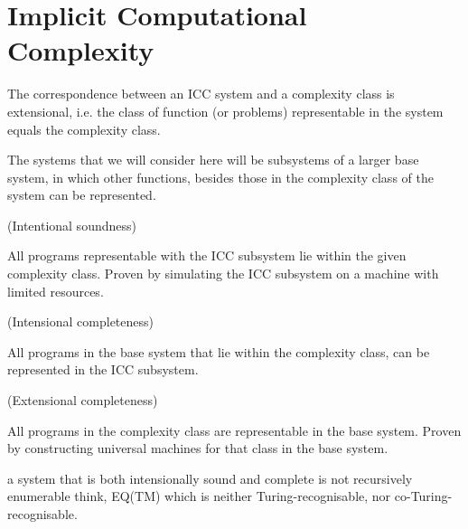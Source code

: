 \chapter{Implicit Computational Complexity}





The correspondence between an ICC system and a complexity class is extensional,
i.e. the class of function (or problems) representable in the system equals the
complexity class.


The systems that we will consider here will be subsystems of a larger base
system, in which other functions, besides those in the complexity class of the
system can be represented.

\begin{definition} (Intentional soundness)

All programs representable with the ICC subsystem lie within the given
complexity class. Proven by simulating the ICC subsystem on a machine with
limited resources.

\end{definition}

\begin{definition} (Intensional completeness)

All programs in the base system that lie within the complexity class, can be
represented in the ICC subsystem.

\end{definition}

\begin{definition} (Extensional completeness)

All programs in the complexity class are representable in the base system.
Proven by constructing universal machines for that class in the base system.

\end{definition}

a system that is both intensionally sound and complete is not recursively
enumerable think, EQ(TM) which is neither Turing-recognisable, nor
co-Turing-recognisable.
